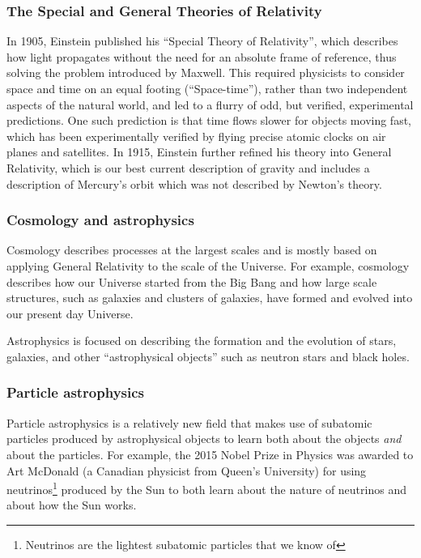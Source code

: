 \subsubsection{The Special and General Theories of Relativity}
In 1905, Einstein published his ``Special Theory of Relativity'', which describes how light propagates without the need for an absolute frame of reference, thus solving the problem introduced by Maxwell. This required physicists to consider space and time on an equal footing (``Space-time''), rather than two independent aspects of the natural world, and led to a flurry of odd, but verified, experimental predictions. One such prediction is that time flows slower for objects moving fast, which has been experimentally verified by flying precise atomic clocks on air planes and satellites. In 1915, Einstein further refined his theory into General Relativity, which is our best current description of gravity and includes a description of Mercury's orbit which was not described by Newton's theory.

\subsubsection{Cosmology and astrophysics} 
Cosmology describes processes at the largest scales and is mostly based on applying General Relativity to the scale of the Universe. For example, cosmology describes how our Universe started from the Big Bang and how large scale structures, such as galaxies and clusters of galaxies, have formed and evolved into our present day Universe. 

Astrophysics is focused on describing the formation and the evolution of stars, galaxies, and other ``astrophysical objects'' such as neutron stars and black holes. 

\subsubsection{Particle astrophysics}
Particle astrophysics is a relatively new field that makes use of subatomic particles produced by astrophysical objects to learn both about the objects \textit{and} about the particles. For example, the 2015 Nobel Prize in Physics was awarded to Art McDonald (a Canadian physicist from Queen's University) for using neutrinos\footnote{Neutrinos are the lightest subatomic particles that we know of} produced by the Sun to both learn about the nature of neutrinos and about how the Sun works. 

